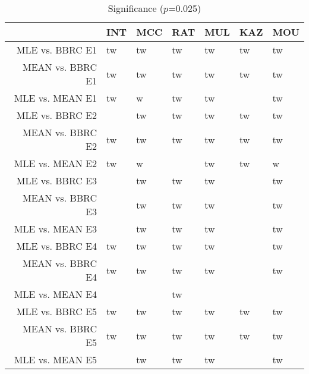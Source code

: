 \begin{table}[t]
\begin{center}
\begin{tabular}{rllllll}
  \hline
 & INT & MCC & RAT & MUL & KAZ & MOU \\ 
  \hline
MLE vs. BBRC E1 & tw & tw & tw & tw & tw & tw \\ 
  MEAN vs. BBRC E1 & tw & tw & tw & tw & tw & tw \\ 
  MLE vs. MEAN E1 & tw & w & tw & tw &  & tw \\ 
  MLE vs. BBRC E2 &  & tw & tw & tw & tw & tw \\ 
  MEAN vs. BBRC E2 & tw & tw & tw & tw & tw & tw \\ 
  MLE vs. MEAN E2 & tw & w &  & tw & tw & w \\ 
  MLE vs. BBRC E3 &  & tw & tw & tw &  & tw \\ 
  MEAN vs. BBRC E3 &  & tw & tw & tw &  & tw \\ 
  MLE vs. MEAN E3 &  & tw & tw & tw &  & tw \\ 
  MLE vs. BBRC E4 & tw & tw & tw & tw &  & tw \\ 
  MEAN vs. BBRC E4 & tw & tw & tw & tw &  & tw \\ 
  MLE vs. MEAN E4 &  &  & tw &  &  &  \\ 
  MLE vs. BBRC E5 & tw & tw & tw & tw & tw & tw \\ 
  MEAN vs. BBRC E5 & tw & tw & tw & tw & tw & tw \\ 
  MLE vs. MEAN E5 &  & tw & tw & tw &  & tw \\ 
   \hline
\end{tabular}
\caption{Significance ($p$=0.025)}
\label{t:sign}
\end{center}
\end{table}
